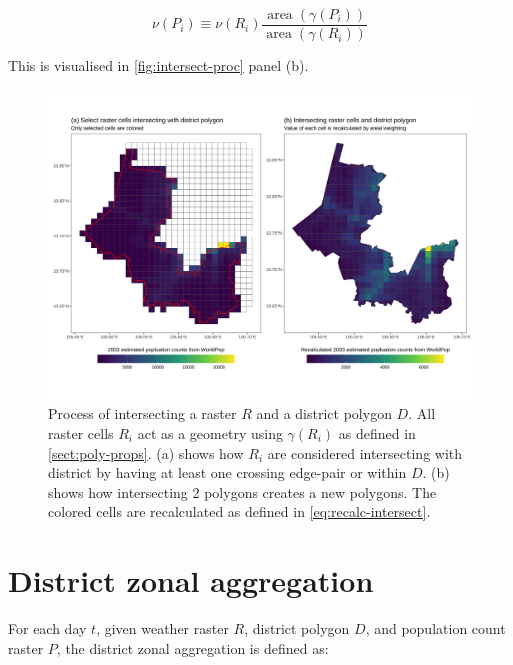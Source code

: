 \documentclass{article}
\begin{document}
\begin{equation} \label{eq:recalc-intersect}
    \nu(P_i) \equiv \nu(R_i)\frac{\operatorname{area}(\gamma(P_i))}{\operatorname{area}(\gamma(R_i))}
\end{equation}


This is visualised in \autoref{fig:intersect-proc} panel (b).

\begin{figure}
    \centering
    \includegraphics[width=1\linewidth]{intersection_process.png}
    \caption{Process of intersecting a raster $R$ and a district polygon $D$. All raster cells $R_i$ act as a geometry using $\gamma(R_i)$ as defined in \ref{sect:poly-props}. (a) shows how $R_i$ are considered intersecting with district by having at least one crossing edge-pair or within $D$. (b) shows how intersecting 2 polygons creates a new polygons. The colored cells are recalculated as defined in \autoref{eq:recalc-intersect}.}
    \label{fig:intersect-proc}
\end{figure}


\section{District zonal aggregation}

For each day $t$, given weather raster $R$, district polygon $D$, and population count raster $P$, the district zonal aggregation is defined as:
\end{document}
